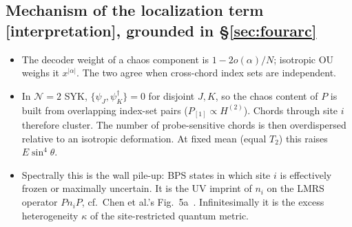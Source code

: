 \documentclass[11pt]{article}
\newcommand{\tagbox}[2]{\textsf{\small\color{#1}[#2]}}
\newcommand{\INTERP}{\tagbox{cconj}{interpretation}}
\theoremstyle{remark}
\begin{document}
\subsection{Mechanism of the localization term \INTERP, grounded in \S\ref{sec:fourarc}}
\begin{itemize}\itemsep1pt
\item The decoder weight of a chaos component is $1-2o(\alpha)/N$; isotropic OU weighs it $x^{|\alpha|}$. The two agree
  when cross-chord index sets are independent.
\item In $\mathcal N=2$ SYK, $\{\psi_J,\psi_K^\dagger\}=0$ for disjoint $J,K$, so the chaos content of $P$ is built from
  overlapping index-set pairs ($P_{[1]}\propto H^{(2)}$). Chords through site $i$ therefore cluster. The number of
  probe-sensitive chords is then overdispersed relative to an isotropic deformation. At fixed mean (equal $T_2$) this
  raises $E\sin^4\theta$.
\item Spectrally this is the wall pile-up: BPS states in which site $i$ is effectively frozen or maximally uncertain. It
  is the UV imprint of $n_i$ on the LMRS operator $Pn_iP$, cf.\ Chen et al.'s Fig.~5a~\cite{CCMP}. Infinitesimally it is the excess heterogeneity
  $\kappa$ of the site-restricted quantum metric.
\end{itemize}
\end{document}
